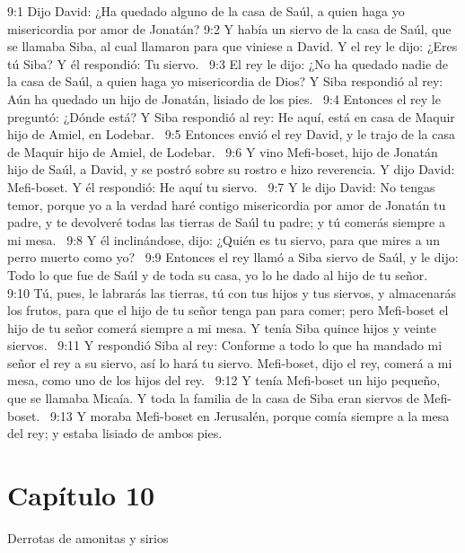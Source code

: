 9:1 Dijo David: ¿Ha quedado alguno de la casa de Saúl, a quien haga yo misericordia por amor de Jonatán? 
9:2 Y había un siervo de la casa de Saúl, que se llamaba Siba, al cual llamaron para que viniese a David. Y el rey le dijo: ¿Eres tú Siba? Y él respondió: Tu siervo.  
9:3 El rey le dijo: ¿No ha quedado nadie de la casa de Saúl, a quien haga yo misericordia de Dios? Y Siba respondió al rey: Aún ha quedado un hijo de Jonatán, lisiado de los pies.  
9:4 Entonces el rey le preguntó: ¿Dónde está? Y Siba respondió al rey: He aquí, está en casa de Maquir hijo de Amiel, en Lodebar.  
9:5 Entonces envió el rey David, y le trajo de la casa de Maquir hijo de Amiel, de Lodebar.  
9:6 Y vino Mefi-boset, hijo de Jonatán hijo de Saúl, a David, y se postró sobre su rostro e hizo reverencia. Y dijo David: Mefi-boset. Y él respondió: He aquí tu siervo.  
9:7 Y le dijo David: No tengas temor, porque yo a la verdad haré contigo misericordia por amor de Jonatán tu padre, y te devolveré todas las tierras de Saúl tu padre; y tú comerás siempre a mi mesa.  
9:8 Y él inclinándose, dijo: ¿Quién es tu siervo, para que mires a un perro muerto como yo?  
9:9 Entonces el rey llamó a Siba siervo de Saúl, y le dijo: Todo lo que fue de Saúl y de toda su casa, yo lo he dado al hijo de tu señor.  
9:10 Tú, pues, le labrarás las tierras, tú con tus hijos y tus siervos, y almacenarás los frutos, para que el hijo de tu señor tenga pan para comer; pero Mefi-boset el hijo de tu señor comerá siempre a mi mesa. Y tenía Siba quince hijos y veinte siervos.  
9:11 Y respondió Siba al rey: Conforme a todo lo que ha mandado mi señor el rey a su siervo, así lo hará tu siervo. Mefi-boset, dijo el rey, comerá a mi mesa, como uno de los hijos del rey.  
9:12 Y tenía Mefi-boset un hijo pequeño, que se llamaba Micaía. Y toda la familia de la casa de Siba eran siervos de Mefi-boset.  
9:13 Y moraba Mefi-boset en Jerusalén, porque comía siempre a la mesa del rey; y estaba lisiado de ambos pies.  
\section*{Capítulo 10}
Derrotas de amonitas y sirios  


